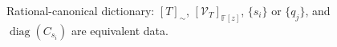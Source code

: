 \begin{figure}[H]
  \centering
  
  \caption{Rational-canonical dictionary: $[T]_{\sim}$, $[\mathcal{V}_T]_{\mathbb{F}[z]}$, $\{s_i\}$ or $\{q_j\}$, and $\operatorname{diag}(C_{s_i})$ are equivalent data.}
  \label{fig:operator-module-canonical-form-dictionary}
\end{figure}
